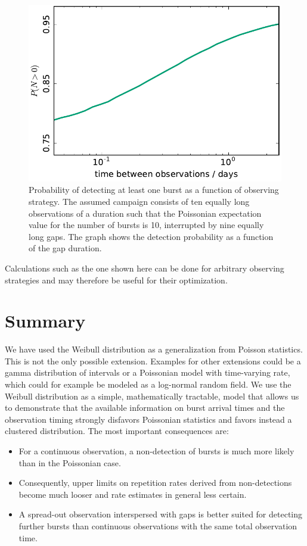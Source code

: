 \documentclass[fleqn,usenatbib]{mnras}
\newcommand{\new}[1]{#1}
\begin{document}
\begin{figure}
	\includegraphics[width=1.0\columnwidth]{obs_strategy.pdf}
	\caption{\label{fig:obs_strategy}Probability of detecting at least one burst as a function of observing strategy. The assumed campaign consists of ten \new{equally long} observations of \new{a duration such that the Poissonian expectation value for the number of bursts is 10}, interrupted by nine equally long gaps. The graph shows the detection probability as a function of the gap duration.}
\end{figure}

Calculations such as the one shown here can be done for arbitrary observing strategies and may therefore be useful for their optimization.


\section{Summary}
\label{sec:summary}


\new{We have used the Weibull distribution as a generalization from Poisson statistics. This is not the only possible extension. Examples for other extensions could be a gamma distribution of intervals or a Poissonian model with time-varying rate, which could for example be modeled as a log-normal random field. We use the Weibull distribution as a simple, mathematically tractable, model that allows us to demonstrate that the available information on burst arrival times and the observation timing strongly disfavors Poissonian statistics and favors instead a clustered distribution. The most important consequences are:
\begin{itemize}
	\item For a continuous observation, a non-detection of bursts is much more likely than in the Poissonian case.
	\item Consequently, upper limits on repetition rates derived from non-detections become much looser and rate estimates in general less certain.
	\item A spread-out observation interspersed with gaps is better suited for detecting further bursts than continuous observations with the same total observation time.
\end{itemize}}
\end{document}
